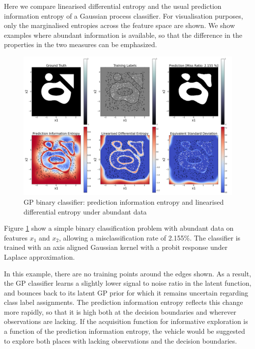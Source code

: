 \documentclass{article}
\begin{document}
		Here we compare linearised differential entropy and the usual prediction information entropy of a Gaussian process classifier. For visualisation purposes, only the marginalised entropies across the feature space are shown. We show examples where abundant information is available, so that the difference in the properties in the two measures can be emphasized. 
		
		\begin{figure}[!htbp]
		\centering
			\includegraphics[width = \linewidth]{Figures/binary_linearised_entropy_horizontal/Figure1.png}
		\caption{GP binary classifier: prediction information entropy and linearised differential entropy under abundant data}
		\label{Figure:Results:BinaryLinearisedEntropy}
		\end{figure}
		
		Figure \ref{Figure:Results:BinaryLinearisedEntropy} show a simple binary classification problem with abundant data on features $x_{1}$ and $x_{2}$, allowing a misclassification rate of 2.155\%. The classifier is trained with an axis aligned Gaussian kernel with a probit response under Laplace approximation. 

		In this example, there are no training points around the edges shown. As a result, the GP classifier learns a slightly lower signal to noise ratio in the latent function, and bounces back to its latent GP prior for which it remains uncertain regarding class label assignments. The prediction information entropy reflects this change more rapidly, so that it is high both at the decision boundaries and wherever observations are lacking. If the acquisition function for informative exploration is a function of the prediction information entropy, the vehicle would be suggested to explore both places with lacking observations and the decision boundaries. 
		
\end{document}
